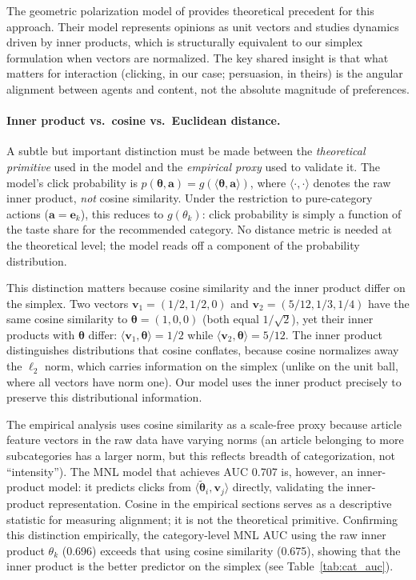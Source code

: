 \documentclass[11pt]{article}
\begin{document}
The geometric polarization model of \citet{hkazla2019geometric} provides theoretical precedent for this approach. Their model represents opinions as unit vectors and studies dynamics driven by inner products, which is structurally equivalent to our simplex formulation when vectors are normalized. The key shared insight is that what matters for interaction (clicking, in our case; persuasion, in theirs) is the angular alignment between agents and content, not the absolute magnitude of preferences.

\paragraph{Inner product vs.\ cosine vs.\ Euclidean distance.} A subtle but important distinction must be made between the \emph{theoretical primitive} used in the model and the \emph{empirical proxy} used to validate it. The model's click probability is $p(\boldsymbol{\theta}, \mathbf{a}) = g(\langle \boldsymbol{\theta}, \mathbf{a} \rangle)$, where $\langle \cdot, \cdot \rangle$ denotes the raw inner product, \emph{not} cosine similarity. Under the restriction to pure-category actions ($\mathbf{a} = \mathbf{e}_k$), this reduces to $g(\theta_k)$: click probability is simply a function of the taste share for the recommended category. No distance metric is needed at the theoretical level; the model reads off a component of the probability distribution.

This distinction matters because cosine similarity and the inner product differ on the simplex. Two vectors $\mathbf{v}_1 = (1/2, 1/2, 0)$ and $\mathbf{v}_2 = (5/12, 1/3, 1/4)$ have the same cosine similarity to $\boldsymbol{\theta} = (1, 0, 0)$ (both equal $1/\sqrt{2}$), yet their inner products with $\boldsymbol{\theta}$ differ: $\langle \mathbf{v}_1, \boldsymbol{\theta} \rangle = 1/2$ while $\langle \mathbf{v}_2, \boldsymbol{\theta} \rangle = 5/12$. The inner product distinguishes distributions that cosine conflates, because cosine normalizes away the $\ell_2$ norm, which carries information on the simplex (unlike on the unit ball, where all vectors have norm one). Our model uses the inner product precisely to preserve this distributional information.

The empirical analysis uses cosine similarity as a scale-free proxy because article feature vectors in the raw data have varying norms (an article belonging to more subcategories has a larger norm, but this reflects breadth of categorization, not ``intensity''). The MNL model that achieves AUC 0.707 is, however, an inner-product model: it predicts clicks from $\langle \tilde{\boldsymbol{\theta}}_i, \mathbf{v}_j \rangle$ directly, validating the inner-product representation. Cosine in the empirical sections serves as a descriptive statistic for measuring alignment; it is not the theoretical primitive. Confirming this distinction empirically, the category-level MNL AUC using the raw inner product $\theta_k$ (0.696) exceeds that using cosine similarity (0.675), showing that the inner product is the better predictor on the simplex (see Table~\ref{tab:cat_auc}).
\end{document}

